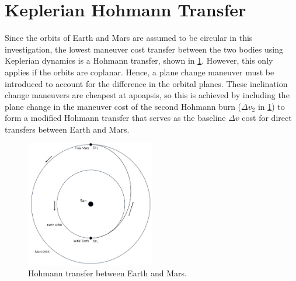 \section{Keplerian Hohmann Transfer}
Since the orbits of Earth and Mars are assumed to be circular in this investigation, the lowest
maneuver cost transfer between the two bodies using Keplerian dynamics is a Hohmann transfer, shown
in \cref{fig:Hohmann}. However, this only applies if the orbits are coplanar. Hence, a plane change
maneuver must be introduced to account for the difference in the orbital planes. These inclination
change maneuvers are cheapest at apoapsis, so this is achieved by including the plane change in the
maneuver cost of the second Hohmann burn ($\Delta v_{2}$ in \cref{fig:Hohmann}) to form a modified
Hohmann transfer that serves as the baseline $\Delta v$ cost for direct transfers between Earth and
Mars.

\begin{figure}[ht]
    \centering
    \includegraphics[width=0.5\textwidth]{figures/Hohmann.jpg}
    \caption{Hohmann transfer between Earth and Mars.}
    \label{fig:Hohmann}
\end{figure}


